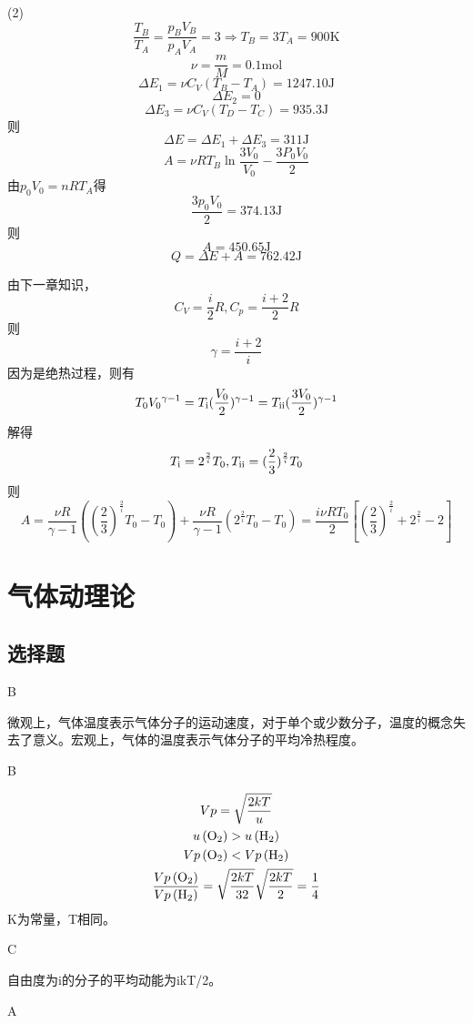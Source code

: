 \documentclass[b5paper,opensource]{./template/qyxf-book}
\newcommand{\RNum}[1]{\uppercase\expandafter{\romannumeral #1\relax}}%
\begin{document}
(2)
\[\frac{{{T_B}}}{{{T_A}}} = \frac{{{p_B}{V_B}}}{{{p_A}{V_A}}} = 3 \Rightarrow {T_B} = 3{T_A} = 900\mathrm{K}\]
\[\nu  = \frac{m}{M} = 0.1\mathrm{mol}\]
\[\Delta {E_1} = \nu {C_V}({T_B} - {T_A}) = 1247.10\mathrm{J}\]
\[\Delta {E_2} = 0\]
\[\Delta {E_3} = \nu {C_V}({T_D} - {T_C}) = 935.3\mathrm{J}\]
则\[\Delta E = \Delta {E_1} + \Delta {E_3} = 311\mathrm{J}\]
\[A = \nu R{T_B}\ln \frac{{3{V_0}}}{{{V_0}}} - \frac{{3P_0V_0}}{2}\]
由${p_0}{V_0} = nR{T_A}$得\[\frac{{3{p_0}{V_0}}}{2} = 374.13\mathrm{J}\]
则\[A = 450.65\mathrm{J}\]
\[Q = \Delta E + A = 762.42\mathrm{J}\]

\solve 由下一章知识，\[{C_V} = \frac{i}{2}R,{C_p} = \frac{{i + 2}}{2}R\]
则
\[\gamma=\frac{{i + 2}}{i}\]
因为是绝热过程，则有
\[{T_0}{V_0}^{\gamma-1}={T_\text{\RNum{1}}}{(\frac{V_0}{2})^{\gamma-1}}= {T_\text{\RNum{2}}}{(\frac{{3{V_0}}}{2})^{\gamma-1}}\]
解得
\[{T_\text{\RNum{1}}} = {2^{\frac{2}{i}}}{T_0},{T_\text{\RNum{2}}} = {(\frac{2}{3})^{\frac{2}{i}}}{T_0}\]
则
\[A = \frac{{\nu R}}{{\gamma-1}}({(\frac{2}{3})^{\frac{2}{i}}}{T_0} - {T_0}) + \frac{{\nu R}}{{\gamma  - 1}}({2^{\frac{2}{i}}}{T_0} - {T_0}) = \frac{{i\nu R{T_0}}}{2}[{(\frac{2}{3})^{\frac{2}{i}}} + {2^{\frac{2}{i}}} - 2]\]

\chapter{气体动理论}
\section{选择题}
B

\solve 微观上，气体温度表示气体分子的运动速度，对于单个或少数分子，温度的概念失去了意义。宏观上，气体的温度表示气体分子的平均冷热程度。

B

\solve
\begin{gather*} 
{Vp=\sqrt{\frac{2kT}{u}}}\\
{u\left(\ce{O2}\right)}>u\left(\ce{H2}\right)\\
{Vp\left(\ce{O2}\right)<Vp\left(\ce{H2}\right) } \\
\frac{Vp\left(\ce{O2}\right)}{Vp\left(\ce{H2}\right)}=\sqrt{\frac{2kT}{32}} \sqrt{\frac{2kT}{2}}=\frac{1}{4}%
\end{gather*}
K为常量，T相同。

C

\solve 自由度为i的分子的平均动能为ikT/2。

A
\end{document}
